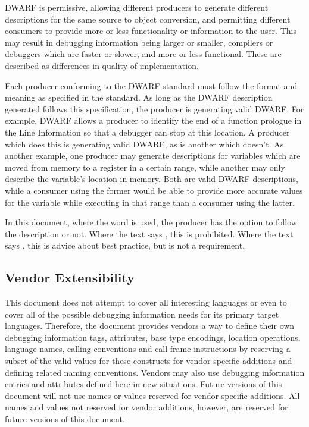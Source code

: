 DWARF is permissive, allowing different producers to generate different
descriptions for the same source to object conversion, and permitting
different consumers to provide more or less functionality or information
to the user.  This may result in debugging information being larger or
smaller, compilers or debuggers which are faster or slower, and more or
less functional.  These are described as differences in 
quality-of-implementation.

Each producer conforming to the DWARF standard must follow the format and
meaning as specified in the standard.  As long as the DWARF description
generated follows this specification, the producer is generating valid DWARF.
For example, DWARF allows a producer to identify the end of a function
prologue in the Line Information so that a debugger can stop at this location.
A producer which does this is generating valid DWARF, as is another which
doesn't.  As another example, one producer may generate descriptions
for variables which are moved from memory to a register in a certain range,
while another may only describe the variable's location in memory.  Both are
valid DWARF descriptions, while a consumer using the former would be able
to provide more accurate values for the variable while executing in that
range than a consumer using the latter.

In this document, where the word  is used, the producer has 
the option to follow the description or not.  Where the text says 
, this is prohibited.  Where the text says , 
this is advice about best practice, but is not a requirement.

\subsection{Vendor Extensibility}
This document does not attempt to cover all interesting
languages or even to cover all of the possible debugging
information needs for its primary target languages. 
Therefore,
the document provides vendors a way to define their own
debugging information tags, attributes, base type encodings,
location operations, language names, calling conventions and
call frame instructions by reserving a subset of the valid
values for these constructs for vendor specific additions
and defining related naming conventions. 
Vendors may also use
debugging information entries and attributes defined here in
new situations. 
Future versions of this document will not use
names or values reserved for vendor specific additions. 
All names and values not reserved for vendor additions, however,
are reserved for future versions of this document.

